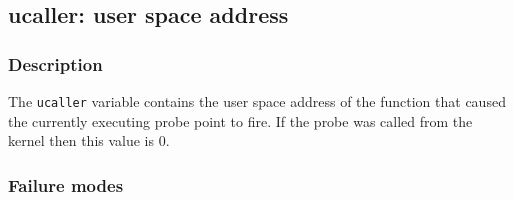 \clearpage
{}
{}
\label{vars:ucaller}
\subsection*{ucaller: user space address}

\subsubsection*{Description}

The \verb|ucaller| variable contains the user space address of the
function that caused the currently executing probe point to fire.  If
the probe was called from the kernel then this value is 0.

\subsubsection*{Failure modes}

